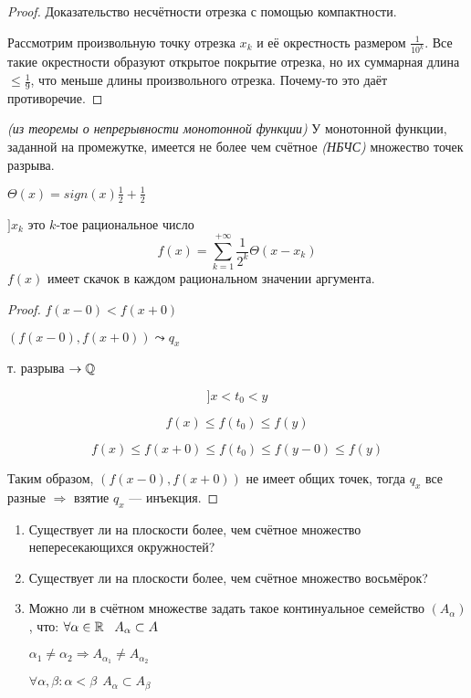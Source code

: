 

\cfoot{}


\begin{proof}
    Доказательство несчётности отрезка с помощью компактности.

    Рассмотрим произвольную точку отрезка $x_k$ и её окрестность размером $\frac{1}{10^k}$. Все такие окрестности образуют открытое покрытие отрезка, но их суммарная длина $\leq\frac{1}{9}$, что меньше длины произвольного отрезка. Почему-то это даёт противоречие.
\end{proof}

\begin{consequence}
    \textit{(из теоремы о непрерывности монотонной функции)}
    У монотонной функции, заданной на промежутке, имеется не более чем счётное \textit{(НБЧС)} множество точек разрыва.
\end{consequence}
\begin{example}
    $\Theta(x) = sign(x) \frac{1}{2} + \frac{1}{2}$

    $] x_k$ это $k$-тое рациональное число
    $$f(x)=\sum\limits_{k=1}^{+\infty} \frac{1}{2^k}\Theta(x-x_k)$$ 
    $f(x)$ имеет скачок в каждом рациональном значении аргумента.
\end{example}
\begin{proof}
    $f(x-0)<f(x+0)$

    $(f(x-0), f(x+0))\leadsto q_x$

    т. разрыва $\to\operatorname*{\mathbb{Q}}$
    
    $$]x<t_0<y$$

    $$f(x)\leq f(t_0)\leq f(y)$$

    $$f(x)\leq f(x+0)\leq f(t_0)\leq f(y-0)\leq f(y)$$

    Таким образом, $(f(x-0), f(x+0))$ не имеет общих точек, тогда $q_x$ все разные $\Rightarrow$ взятие $q_x$ --- инъекция.
\end{proof}
\begin{exercise}
    \begin{enumerate}
        \item Существует ли на плоскости более, чем счётное множество непересекающихся окружностей?
        \item Существует ли на плоскости более, чем счётное множество восьмёрок?
        \item Можно ли в счётном множестве задать такое континуальное семейство $(A_\alpha)$, что:
        $\forall \alpha\in\operatorname*{\mathbb{R}} \ \ A_\alpha\subset A$

        $\alpha_1\not=\alpha_2 \Rightarrow A_{\alpha_1}\not=A_{\alpha_2}$

        $\forall \alpha,\beta: \alpha<\beta \ \ A_\alpha\subset A_\beta$
    \end{enumerate}
\end{exercise}
